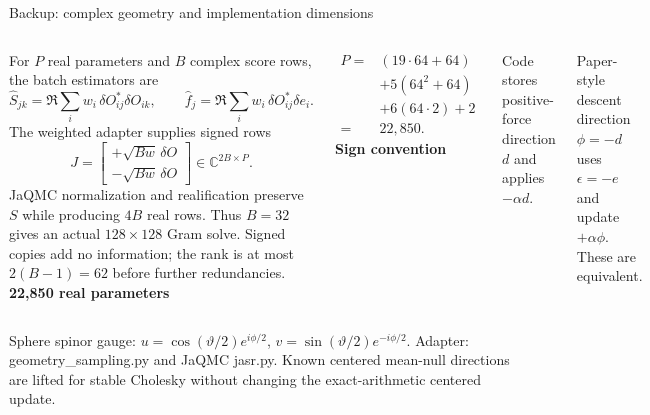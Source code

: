 \documentclass[aspectratio=169,10pt]{beamer}
\newcommand{\src}[1]{\vfill{\fontsize{6.3}{7.5}\selectfont\color{muted}#1\par}}
\begin{document}
\begin{frame}{Backup: complex geometry and implementation dimensions}
\begin{columns}[T,onlytextwidth]
\small
For $P$ real parameters and $B$ complex score rows, the batch estimators are
\[
\widehat S_{jk}=\Re\sum_iw_i\,\delta O_{ij}^*\delta O_{ik},\qquad
\widehat f_j=\Re\sum_iw_i\,\delta O_{ij}^*\delta e_i.
\]
The weighted adapter supplies signed rows
\[
J=\begin{bmatrix}+\sqrt{Bw}\,\delta O\\-\sqrt{Bw}\,\delta O\end{bmatrix}
\in\mathbb C^{2B\times P}.
\]
JaQMC normalization and realification preserve $S$ while producing $4B$ real rows. Thus $B=32$ gives an actual \textbf{$128\times128$} Gram solve. Signed copies add no information; the rank is at most $2(B-1)=62$ before further redundancies.
\textbf{22,850 real parameters}\par\small
\begin{align*}
P={}&(19\cdot64+64)\\
&+5(64^2+64)\\
&+6(64\cdot2)+2\\
={}&22,850.
\end{align*}
\textbf{Sign convention}\par\smallskip
Code stores positive-force direction $d$ and applies $-\alpha d$.\par\smallskip
Paper-style descent direction $\phi=-d$ uses $\epsilon=-e$ and update $+\alpha\phi$. These are equivalent.
\end{columns}
\src{Sphere spinor gauge: $u=\cos(\vartheta/2)e^{i\phi/2}$, $v=\sin(\vartheta/2)e^{-i\phi/2}$. Adapter: geometry\_sampling.py and JaQMC jasr.py. Known centered mean-null directions are lifted for stable Cholesky without changing the exact-arithmetic centered update.}
\end{frame}
\end{document}
